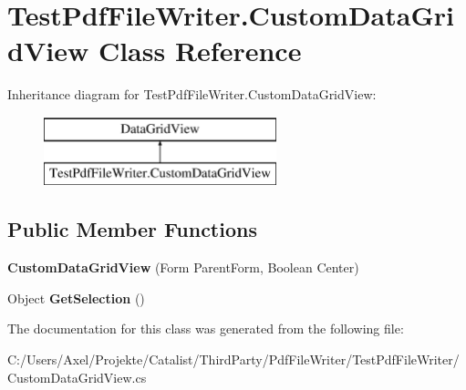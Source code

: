 \hypertarget{class_test_pdf_file_writer_1_1_custom_data_grid_view}{}\section{Test\+Pdf\+File\+Writer.\+Custom\+Data\+Grid\+View Class Reference}
\label{class_test_pdf_file_writer_1_1_custom_data_grid_view}
Inheritance diagram for Test\+Pdf\+File\+Writer.\+Custom\+Data\+Grid\+View\+:\begin{figure}[H]
\begin{center}
\leavevmode
\includegraphics[height=2.000000cm]{class_test_pdf_file_writer_1_1_custom_data_grid_view}
\end{center}
\end{figure}
\subsection*{Public Member Functions}
\begin{DoxyCompactItemize}
\item 
{\bfseries Custom\+Data\+Grid\+View} (Form Parent\+Form, Boolean Center)\hypertarget{class_test_pdf_file_writer_1_1_custom_data_grid_view_a3576ce2b52b03199236825774e13b712}{}\label{class_test_pdf_file_writer_1_1_custom_data_grid_view_a3576ce2b52b03199236825774e13b712}

\item 
Object {\bfseries Get\+Selection} ()\hypertarget{class_test_pdf_file_writer_1_1_custom_data_grid_view_acfbf9c4e3273257f4df796706bf516fd}{}\label{class_test_pdf_file_writer_1_1_custom_data_grid_view_acfbf9c4e3273257f4df796706bf516fd}

\end{DoxyCompactItemize}


The documentation for this class was generated from the following file\+:\begin{DoxyCompactItemize}
\item 
C\+:/\+Users/\+Axel/\+Projekte/\+Catalist/\+Third\+Party/\+Pdf\+File\+Writer/\+Test\+Pdf\+File\+Writer/Custom\+Data\+Grid\+View.\+cs\end{DoxyCompactItemize}
